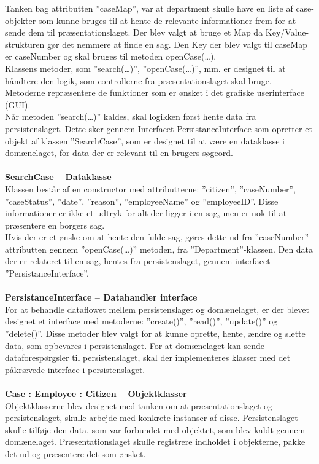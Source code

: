 Tanken bag attributten ”caseMap”, var at department skulle have en liste af case-objekter som kunne bruges til at hente de relevante informationer frem for at sende dem til præsentationslaget. Der blev valgt at bruge et Map da Key/Value-strukturen gør det nemmere at finde en sag. Den Key der blev valgt til caseMap er caseNumber og skal bruges til metoden openCase(…).\\
Klassens metoder, som ”search(…)”, ”openCase(…)”, mm. er designet til at håndtere den logik, som controllerne fra præsentationslaget skal bruge. Metoderne repræsentere de funktioner som er ønsket i det grafiske userinterface (GUI).\\
Når metoden ”search(…)” kaldes, skal logikken først hente data fra persistenslaget. Dette sker gennem Interfacet PersistanceInterface som opretter et objekt af klassen ”SearchCase”, som er designet til at være en dataklasse i domænelaget, for data der er relevant til en brugers søgeord.\\ \\
\textbf{SearchCase – Dataklasse}\\
Klassen består af en constructor med attributterne: ”citizen”, ”caseNumber”, ”caseStatus”, ”date”, ”reason”, ”employeeName” og ”employeeID”. Disse informationer er ikke et udtryk for alt der ligger i en sag, men er nok til at præsentere en borgers sag. \\
Hvis der er et ønske om at hente den fulde sag, gøres dette ud fra ”caseNumber”-attributten gennem ”openCase(…)” metoden, fra ”Department”-klassen. Den data der er relateret til en sag, hentes fra persistenslaget, gennem interfacet ”PersistanceInterface”.\\
\\
\textbf{PersistanceInterface – Datahandler interface}\\
For at behandle dataflowet mellem persistenslaget og domænelaget, er der blevet designet et interface med metoderne: ”create()”, ”read()”, ”update()” og ”delete()”. Disse metoder blev valgt for at kunne oprette, hente, ændre og slette data, som opbevares i persistenslaget. For at domænelaget kan sende dataforespørgsler til persistenslaget, skal der implementeres klasser med det påkrævede interface i persistenslaget.\\ 
\\
\textbf{Case : Employee : Citizen – Objektklasser}\\
Objektklasserne blev designet med tanken om at præsentationslaget og persistenslaget, skulle arbejde med konkrete instanser af disse. Persistenslaget skulle tilføje den data, som var forbundet med objektet, som blev kaldt gennem domænelaget. Præsentationslaget skulle registrere indholdet i objekterne, pakke det ud og præsentere det som ønsket. \\
